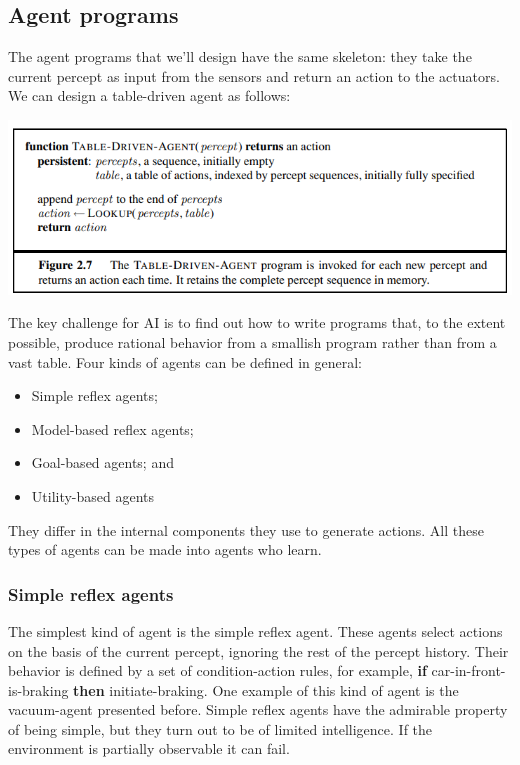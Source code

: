 \subsection{Agent programs}
The agent programs that we'll design have the same skeleton: they take the current percept as input from the sensors and return an action to the actuators. We can design a table-driven agent as follows:
\begin{center}
    \includegraphics[]{images/Table-driven agent.png}
\end{center}
The key challenge for AI is to find out how to write programs that, to the extent possible, produce rational behavior from a smallish program rather than from a vast table.\newline\newline
Four kinds of agents can be defined in general:
\begin{itemize}
    \item Simple reflex agents;
    \item Model-based reflex agents;
    \item Goal-based agents; and
    \item Utility-based agents
\end{itemize}
They differ in the internal components they use to generate actions. All these types of agents can be made into agents who learn.

\subsubsection{Simple reflex agents}
The simplest kind of agent is the simple reflex agent. These agents select actions on the basis of the current percept, ignoring the rest of the percept history. Their behavior is defined by a set of condition-action rules, for example, \textbf{if} car-in-front-is-braking \textbf{then} initiate-braking. One example of this kind of agent is the vacuum-agent presented before.\newline\newline
Simple reflex agents have the admirable property of being simple, but they turn out to be of limited intelligence. If the environment is partially observable it can fail.

